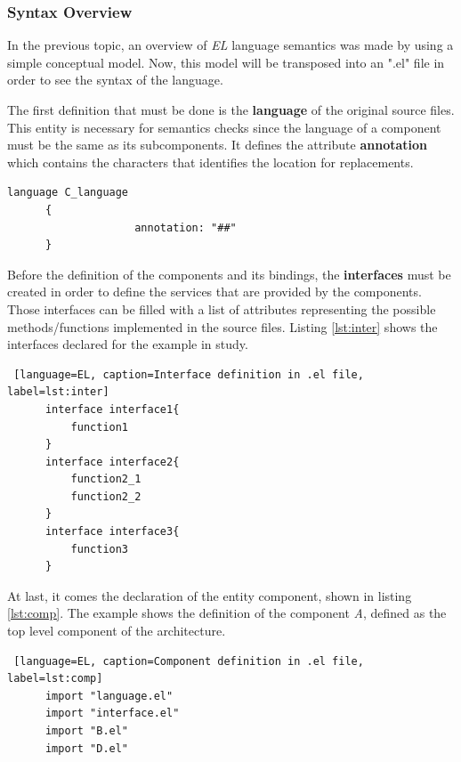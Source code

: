 \documentclass[12pt]{article}
\newcounter{subsubsubsection}[subsubsection]
\begin{document}
{\subsubsection{Syntax Overview}

In the previous topic, an overview of  \textit{EL} language semantics was made by using a simple conceptual model. Now, this model will be transposed into an ".el" file in order to see the syntax of the language. 


The first definition that must be done is the \textbf{language} of the original source files. This entity is necessary for semantics checks since the language of a component must be the same as its subcomponents. It defines the attribute \textbf{annotation} which contains the characters that identifies the location for replacements. 
\begin{lstlisting}[language=EL, caption={Language definition in .el file}, label=lst:lang]
      language C_language
      {	
      				annotation: "##"	
      }    
\end{lstlisting}


Before the definition of the components and its bindings, the \textbf{interfaces} must be created in order to define the services that are provided by the components. Those interfaces can be filled with a list of attributes representing the possible methods/functions implemented in the source files. Listing \ref{lst:inter} shows the interfaces declared for the example in study.

\begin{lstlisting} [language=EL, caption=Interface definition in .el file, label=lst:inter]
      interface interface1{
          function1
      }
      interface interface2{
          function2_1  
          function2_2
      }
      interface interface3{
          function3
      }
\end{lstlisting}



At last, it comes the declaration of the entity component, shown in listing \ref{lst:comp}. The example shows the definition of the component \textit{A}, defined as the top level component of the architecture. 

\begin{lstlisting} [language=EL, caption=Component definition in .el file, label=lst:comp]
      import "language.el"
      import "interface.el"
      import "B.el"
      import "D.el"


\end{lstlisting}}
\end{document}

